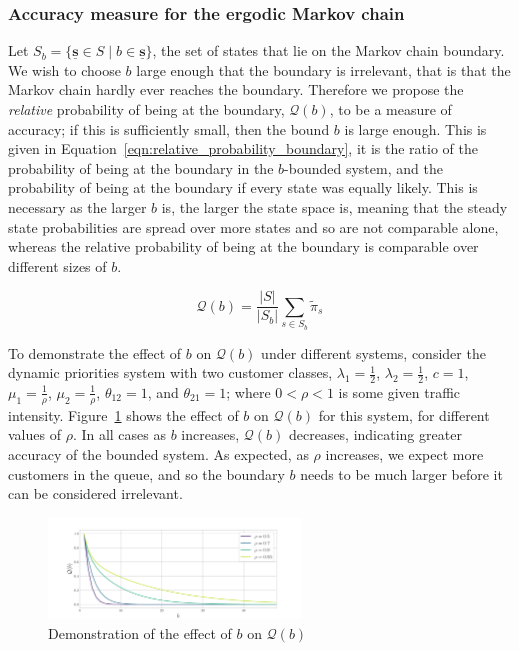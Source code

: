 \documentclass{article}
\begin{document}
\subsubsection{Accuracy measure for the ergodic Markov chain}\label{sec:ergodic_accuracy}
Let $S_b = \{\underline{\mathbf{s}} \in S \;|\; b \in \underline{\mathbf{s}}\}$,
the set of states that lie on the Markov chain boundary. We wish to choose $b$
large enough that the boundary is irrelevant, that is that the Markov chain
hardly ever reaches the boundary. Therefore we propose the \textit{relative}
probability of being at the boundary, $\mathcal{Q}(b)$, to be a measure of
accuracy; if this is sufficiently small, then the bound $b$ is large enough.
This is given in Equation~\ref{eqn:relative_probability_boundary}, it is the
ratio of the probability of being at the boundary in the $b$-bounded system, and
the probability of being at the boundary if every state was equally likely. This
is necessary as the larger $b$ is, the larger the state space is, meaning that
the steady state probabilities are spread over more states and so are not
comparable alone, whereas the relative probability of being at the boundary is
comparable over different sizes of $b$.

\begin{equation}\label{eqn:relative_probability_boundary}
\mathcal{Q}(b) = \frac{|S|}{|S_b|} \sum_{s \in S_b} \tilde{\pi}_s
\end{equation}

To demonstrate the effect of $b$ on $\mathcal{Q}(b)$ under different systems,
consider the dynamic priorities system with two customer classes,
$\lambda_1 = \frac{1}{2}$, $\lambda_2 = \frac{1}{2}$, $c = 1$,
$\mu_1 = \frac{1}{\rho}$, $\mu_2 = \frac{1}{\rho}$, $\theta_{12} = 1$, and
$\theta_{21} = 1$; where $0 < \rho < 1$ is some given traffic intensity.
Figure~\ref{fig:ergodic_accuracy} shows the effect of $b$ on $\mathcal{Q}(b)$
for this system, for different values of $\rho$. In all cases as $b$ increases,
$\mathcal{Q}(b)$ decreases, indicating greater accuracy of the bounded system.
As expected, as $\rho$ increases, we expect more customers in the queue, and so
the boundary $b$ needs to be much larger before it can be considered irrelevant.

\begin{figure}
  \begin{center}
    \includegraphics[width=0.6\textwidth]{img/quotient_accuracy.pdf}
  \end{center}
  \caption{Demonstration of the effect of $b$ on $\mathcal{Q}(b)$}
  \label{fig:ergodic_accuracy}
\end{figure}
\end{document}
